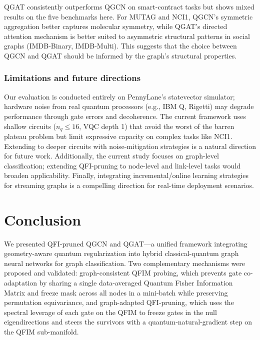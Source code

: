 \documentclass[journal]{IEEEtran}
\begin{document}
QGAT consistently outperforms QGCN on smart-contract tasks
but shows mixed results on the five benchmarks here. For MUTAG and NCI1,
QGCN's symmetric aggregation better captures molecular symmetry, while
QGAT's directed attention mechanism is better suited to asymmetric
structural patterns in social graphs (IMDB-Binary, IMDB-Multi). This
suggests that the choice between QGCN and QGAT should be informed by
the graph's structural properties.

\subsubsection{Limitations and future directions}

Our evaluation is conducted entirely on PennyLane's statevector simulator;
hardware noise from real quantum processors (e.g., IBM Q, Rigetti) may
degrade performance through gate errors and decoherence. The current
framework uses shallow circuits ($n_q \leq 16$, VQC depth 1) that avoid
the worst of the barren plateau problem but limit expressive capacity on
complex tasks like NCI1. Extending to deeper circuits with noise-mitigation
strategies is a natural direction for future work.
Additionally, the current study focuses on graph-level classification;
extending QFI-pruning to node-level and link-level tasks would broaden
applicability. Finally, integrating incremental/online learning
strategies for streaming graphs is a compelling
direction for real-time deployment scenarios.

\section{Conclusion}
\label{sec:conclusion}

We presented QFI-pruned QGCN and QGAT---a unified framework integrating
geometry-aware quantum regularization into hybrid classical-quantum graph
neural networks for graph classification. Two complementary mechanisms were
proposed and validated: graph-consistent QFIM probing, which prevents gate
co-adaptation by sharing a single data-averaged Quantum Fisher Information
Matrix and freeze mask across all nodes in a mini-batch while preserving
permutation equivariance, and graph-adapted QFI-pruning, which uses the
spectral leverage of each gate on the QFIM to freeze gates in the null
eigendirections and steers the survivors with a quantum-natural-gradient
step on the QFIM sub-manifold.
\end{document}
